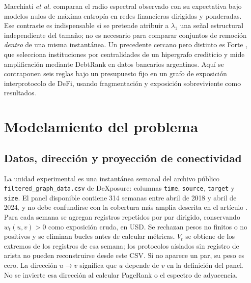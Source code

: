 \documentclass[journal]{IEEEtran}
\begin{document}
Macchiati \emph{et al.} \cite{macchiati2024spectral} comparan el radio
espectral observado con su expectativa bajo modelos nulos de máxima entropía
en redes financieras dirigidas y ponderadas. Ese contraste es indispensable si
se pretende atribuir a $\lambda_1$ una señal estructural independiente del
tamaño; no es necesario para comparar conjuntos de remoción \emph{dentro} de
una misma instantánea. Un precedente cercano pero distinto es Forte
\cite{forte2026hypergraphs}, que selecciona instituciones por centralidades de
un hipergrafo crediticio y mide amplificación mediante DebtRank en datos
bancarios argentinos. Aquí se contraponen seis reglas bajo un presupuesto fijo
en un grafo de exposición interprotocolo de DeFi, usando fragmentación y
exposición sobreviviente como resultados.

\section{Modelamiento del problema}

\subsection{Datos, dirección y proyección de conectividad}

La unidad experimental es una instantánea semanal del archivo público
\texttt{filtered\_graph\_data.csv} de DeXposure: columnas \texttt{time},
\texttt{source}, \texttt{target} y \texttt{size}. El panel disponible contiene
314 semanas entre abril de 2018 y abril de 2024, y no debe confundirse con
la cobertura más amplia descrita en el artículo \cite{wu2025dexposure}. Para
cada semana se agregan registros repetidos por par dirigido, conservando
$w_t(u,v)>0$ como exposición cruda, en USD. Se rechazan pesos no finitos o
no positivos y se eliminan bucles antes de calcular métricas. $V_t$ se obtiene
de los extremos de los registros de esa semana; los protocolos aislados sin
registro de arista no pueden reconstruirse desde este CSV. Si no aparece un
par, su peso es cero.
La dirección $u\to v$ significa que $u$ depende de $v$ en la definición del
panel. No se invierte esa dirección al calcular PageRank o el espectro de
adyacencia.
\end{document}
